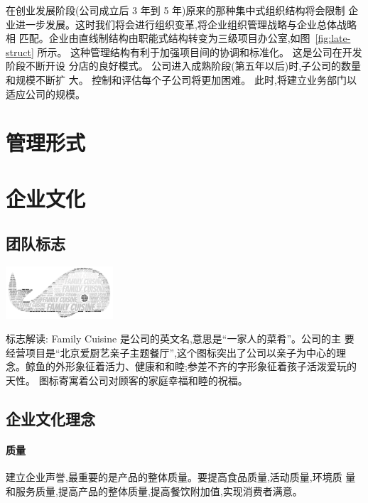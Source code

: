 

在创业发展阶段(公司成立后 3 年到 5 年)原来的那种集中式组织结构将会限制
企业进一步发展。这时我们将会进行组织变革,将企业组织管理战略与企业总体战略相
匹配。企业由直线制结构由职能式结构转变为三级项目办公室,如图~\ref{fig:late-struct}
所示。 这种管理结构有利于加强项目间的协调和标准化。 这是公司在开发阶段不断开设
分店的良好模式。 公司进入成熟阶段(第五年以后)时,子公司的数量和规模不断扩
大。 控制和评估每个子公司将更加困难。 此时,将建立业务部门以适应公司的规模。

\section{管理形式}


\section{企业文化}
\subsection{团队标志}

\begin{center}
        \includegraphics[width=0.3\textwidth]{../images/company-logo}
        \label{fig:company-logo}
\end{center}

标志解读: Family Cuisine 是公司的英文名,意思是“一家人的菜肴”。公司的主
要经营项目是“北京爱厨艺亲子主题餐厅”,这个图标突出了公司以亲子为中心的理
念。鲸鱼的外形象征着活力、健康和和睦;参差不齐的字形象征着孩子活泼爱玩的天性。
图标寄寓着公司对顾客的家庭幸福和睦的祝福。

\subsection{企业文化理念}
\paragraph{质量}
建立企业声誉,最重要的是产品的整体质量。要提高食品质量,活动质量,环境质
量和服务质量,提高产品的整体质量,提高餐饮附加值,实现消费者满意。

